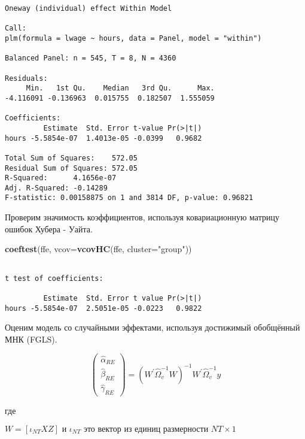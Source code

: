 \documentclass[]{article}
\newenvironment{Shaded}{\begin{snugshade}}{\end{snugshade}}
\newcommand{\DataTypeTok}[1]{\textcolor[rgb]{0.13,0.29,0.53}{#1}}
\newcommand{\KeywordTok}[1]{\textcolor[rgb]{0.13,0.29,0.53}{\textbf{#1}}}
\newcommand{\NormalTok}[1]{#1}
\newcommand{\StringTok}[1]{\textcolor[rgb]{0.31,0.60,0.02}{#1}}
\begin{document}
\begin{verbatim}
Oneway (individual) effect Within Model

Call:
plm(formula = lwage ~ hours, data = Panel, model = "within")

Balanced Panel: n = 545, T = 8, N = 4360

Residuals:
     Min.   1st Qu.    Median   3rd Qu.      Max. 
-4.116091 -0.136963  0.015755  0.182507  1.555059 

Coefficients:
         Estimate  Std. Error t-value Pr(>|t|)
hours -5.5854e-07  1.4013e-05 -0.0399   0.9682

Total Sum of Squares:    572.05
Residual Sum of Squares: 572.05
R-Squared:      4.1656e-07
Adj. R-Squared: -0.14289
F-statistic: 0.00158875 on 1 and 3814 DF, p-value: 0.96821
\end{verbatim}

Проверим значимость коэффициентов, используя ковариационную матрицу
ошибок Хубера - Уайта.

\begin{Shaded}
\begin{Highlighting}[]
\KeywordTok{coeftest}\NormalTok{(ffe, }\DataTypeTok{vcov=}\KeywordTok{vcovHC}\NormalTok{(ffe, }\DataTypeTok{cluster=}\StringTok{"group"}\NormalTok{))}
\end{Highlighting}
\end{Shaded}

\begin{verbatim}

t test of coefficients:

         Estimate  Std. Error t value Pr(>|t|)
hours -5.5854e-07  2.5051e-05 -0.0223   0.9822
\end{verbatim}

Оценим модель со случайными эффектами, используя достижимый обобщённый
МНК (FGLS).

\begin{equation}
\left(\begin{array}{c}{\widehat{\alpha}_{R E}} \\ {\widehat{\beta}_{R E}} \\ {\widehat{\gamma}_{R E}}\end{array}\right)=\left(W^{\prime} \widehat{\Omega}_{v}^{-1} W\right)^{-1} W^{\prime} \widehat{\Omega}_{v}^{-1} y
\end{equation}

где

\(W=\left[\iota_{N T} X Z\right] \text { и } \iota_{N T} \text { это вектор из единиц размерности } N T \times 1\)
\end{document}
